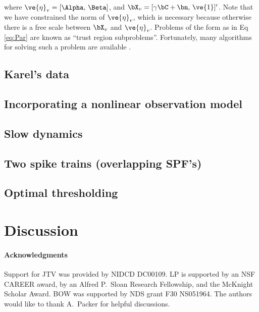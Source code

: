 \noindent where $\ve{\eta}_v=[\Alpha, \, \Beta]$, and $\bX_v=[\gamma \bC + \bn, \, \ve{1}]'$. Note that we have constrained the norm of $\ve{\eta}_v$, which is necessary because otherwise there is a free scale between $\bX_v$ and $\ve{\eta}_v$.  Problems of the form as in Eq \eqref{eq:Par} are known as ``trust region subproblems''.  Fortunately, many algorithms for solving such a problem are available \cite{Fortin00}.  

\subsection{Karel's data}

\subsection{Incorporating a nonlinear observation model}

\subsection{Slow dynamics}

\subsection{Two spike trains (overlapping SPF's)}

\subsection{Optimal thresholding}

\section{Discussion}

\paragraph{Acknowledgments}

Support for JTV was provided by NIDCD DC00109. LP is supported by an NSF CAREER award, by an Alfred P.\ Sloan Research Fellowship, and the McKnight Scholar Award. BOW was supported by NDS grant F30 NS051964. The authors would like to thank A.\ Packer for helpful discussions.


%

%
%


